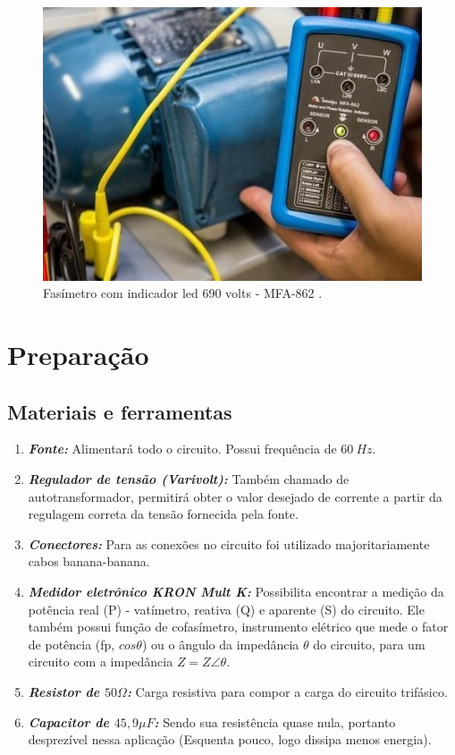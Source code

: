 \documentclass[a4paper,12pt,oneside,openany,table,xcdraw]{article}
\begin{document}
\vspace{0.5cm}
\begin{figure}[H]
\centering
\includegraphics[width=12.5cm]{fasimetro}
\caption{Fasímetro com indicador led 690 volts - MFA-862 \cite{fig1}.}
\label{intro:fig1}
\end{figure}
\vspace{0.3cm}


\section{Preparação}
\subsection{Materiais e ferramentas} %
\begin{enumerate}[1 -]
\item \emph{\textbf{Fonte:}}
Alimentará todo o circuito. Possui frequência de $60\ Hz$.

\item \emph{\textbf{Regulador de tensão (Varivolt):}}
Também chamado de autotransformador, permitirá obter o valor desejado de corrente a partir da regulagem correta da tensão fornecida pela fonte.

\item \emph{\textbf{Conectores:}}
Para as conexões no circuito foi utilizado majoritariamente cabos banana-banana.

\item \emph{\textbf{Medidor eletrônico KRON Mult K:}}
Possibilita encontrar a medição da potência real (P) - vatímetro, reativa (Q) e aparente (S) do circuito. Ele também possui função de cofasímetro, instrumento elétrico que mede o fator de potência (fp, $cos\theta$) ou o ângulo da impedância $\theta$ do circuito, para um circuito com a impedância $Z = Z\angle \theta$.

\item \emph{\textbf{Resistor de $50\Omega$:}}
Carga resistiva para compor a carga do circuito trifásico.

\item \emph{\textbf{Capacitor de $45,9\mu F$:}}
Sendo sua resistência quase nula, portanto desprezível nessa aplicação (Esquenta pouco, logo dissipa menos energia).
\end{enumerate}
\end{document}
